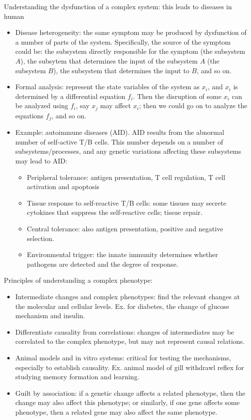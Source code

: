 \documentclass{report}
\begin{document}
Understanding the dysfunction of a complex system: this leads to diseases in human
\begin{itemize}
\item Disease heterogeneity: the same symptom may be produced by dysfunction of a number of parts of the system. Specifically, the source of the symptom could be: the subsystem directly responsible for the symptom (the subsystem $A$), the subsytem that determines the input of the subsystem $A$ (the subsystem $B$), the subsystem that determines the input to $B$, and so on. 

\item Formal analysis: represent the state variables of the system as $x_i$, and $x_i$ is determined by a differential equation $f_i$. Then the disruption of some $x_i$ can be analyzed using $f_i$, say $x_j$ may affect $x_i$; then we could go on to analyze the equations $f_j$, and so on. 

\item Example: autoimmune diseases (AID). AID results from the abnormal number of self-active T/B cells. This number depends on a number of subsystems/processes, and any genetic variations affecting these subsystems may lead to AID: 
\begin{itemize}
	\item Peripheral tolerance: antigen presentation, T cell regulation, T cell activation and apoptosis
	\item Tissue response to self-reactive T/B cells: some tissues may secrete cytokines that suppress the self-reactive cells; tissue repair. 
	\item Central tolerance: also antigen presentation, positive and negative selection. 
	\item Environmental trigger: the innate immunity determines whether pathogens are detected and the degree of response. 
\end{itemize} 

\end{itemize}

Principles of understanding a complex phenotype: 
\begin{itemize}
\item Intermediate changes and complex phenotypes: find the relevant changes at the molecular and cellular levels. Ex. for diabetes, the change of glucose mechanism and insulin. 

\item Differentiate causality from correlations: changes of intermediates may be correlated to the complex phenotype, but may not represent causal relations. 

\item Animal models and in vitro systems: critical for testing the mechanisms, especially to establish causality. Ex. animal model of gill withdrawl reflex for studying memory formation and learning. 

\item Guilt by association: if a genetic change affects a related phenotype, then the change may also affect this phenotype; or similarly, if one gene affects some phenotype, then a related gene may also affect the same phenotype. 
\end{itemize}
\end{document}
